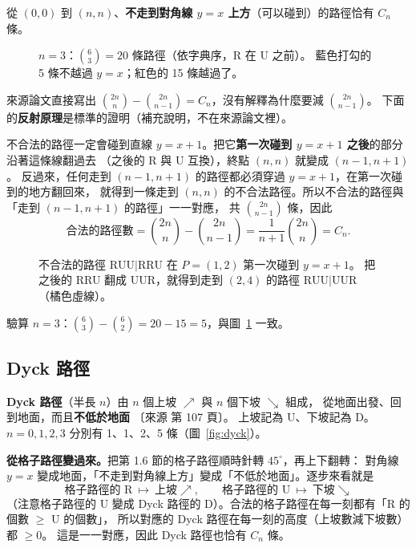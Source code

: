\documentclass[11pt,a4paper]{article}
\newcommand{\src}[1]{{\small\color{gray!70!black}〔來源 #1〕}}  %
\begin{document}
\begin{thmbox}[格子路徑]
從 $(0,0)$ 到 $(n,n)$、\textbf{不走到對角線 $y=x$ 上方}（可以碰到）的路徑恰有 $C_n$ 條。
\end{thmbox}

\begin{figure}[H]
\centering
\FigLatticeAll
\caption{$n=3$：$\binom{6}{3}=20$ 條路徑（依字典序，R 在 U 之前）。
\textcolor{cA}{藍色打勾}的 5 條不越過 $y=x$；\textcolor{cBad}{紅色}的 15 條越過了。}
\label{fig:latticeall}
\end{figure}

來源論文直接寫出 $\binom{2n}{n}-\binom{2n}{n-1}=C_n$，沒有解釋為什麼要減 $\binom{2n}{n-1}$。
下面的\textbf{反射原理}是標準的證明（補充說明，不在來源論文裡）。

\begin{notebox}[反射原理（補充）]
不合法的路徑一定會碰到直線 $y=x+1$。把它\textbf{第一次碰到 $y=x+1$ 之後}的部分沿著這條線翻過去
（之後的 R 與 U 互換），終點 $(n,n)$ 就變成 $(n-1,n+1)$。
反過來，任何走到 $(n-1,n+1)$ 的路徑都必須穿過 $y=x+1$，在第一次碰到的地方翻回來，
就得到一條走到 $(n,n)$ 的不合法路徑。所以不合法的路徑與「走到 $(n-1,n+1)$ 的路徑」一一對應，
共 $\binom{2n}{n-1}$ 條，因此
\[
\text{合法的路徑數}=\binom{2n}{n}-\binom{2n}{n-1}=\frac{1}{n+1}\binom{2n}{n}=C_n .
\]
\end{notebox}

\begin{figure}[H]
\centering
\FigReflection
\caption{不合法的路徑 $\mathrm{RUU}|\mathrm{RRU}$ 在 $P=(1,2)$ 第一次碰到 $y=x+1$。
把之後的 RRU 翻成 UUR，就得到走到 $(2,4)$ 的路徑 $\mathrm{RUU}|\mathrm{UUR}$（\textcolor{cTop}{橘色虛線}）。}
\label{fig:reflection}
\end{figure}

驗算 $n=3$：$\binom{6}{3}-\binom{6}{2}=20-15=5$，與圖~\ref{fig:latticeall} 一致。

\subsection{Dyck 路徑}

\textbf{Dyck 路徑}（半長 $n$）由 $n$ 個上坡 $\nearrow$ 與 $n$ 個下坡 $\searrow$ 組成，
從地面出發、回到地面，而且\textbf{不低於地面} \src{第 107 頁}。
上坡記為 U、下坡記為 D。$n=0,1,2,3$ 分別有 1、1、2、5 條（圖~\ref{fig:dyck}）。

\textbf{從格子路徑變過來。}把第 1.6 節的格子路徑順時針轉 $45^\circ$，再上下翻轉：
對角線 $y=x$ 變成地面，「不走到對角線上方」變成「不低於地面」。逐步來看就是
\[
\text{格子路徑的 R}\ \mapsto\ \text{上坡}\nearrow,\qquad \text{格子路徑的 U}\ \mapsto\ \text{下坡}\searrow
\]
（注意格子路徑的 U 變成 Dyck 路徑的 D）。合法的格子路徑在每一刻都有「R 的個數 $\ge$ U 的個數」，
所以對應的 Dyck 路徑在每一刻的高度（上坡數減下坡數）都 $\ge0$。
這是一一對應，因此 Dyck 路徑也恰有 $C_n$ 條。
\end{document}
